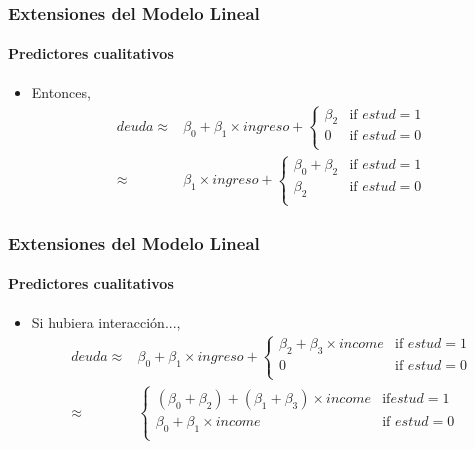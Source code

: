 \documentclass{beamer}
\begin{document}
\begin{frame}
\frametitle{Extensiones del Modelo Lineal}
\framesubtitle{Predictores cualitativos}
	\begin{itemize}
		\item Entonces, 
			\begin{equation}
			\begin{aligned}
			deuda  \approx & \beta_{0} + \beta_{1} \times ingreso + \begin{cases} 
																\beta_{2} & \text{if } estud = 1 \\
																0        & \text{if } estud = 0 \\
															   \end{cases} \\
			       \approx & \beta_{1} \times ingreso + \begin{cases} 
			       									\beta_{0} + \beta_{2} & \text{if } estud = 1 \\
			       									 \beta_{2}            & \text{if } estud = 0 \\
											       \end{cases}  				
			\end{aligned}			
			\end{equation}
	\end{itemize}
\end{frame}

\begin{frame}
\frametitle{Extensiones del Modelo Lineal}
\framesubtitle{Predictores cualitativos}

\begin{itemize}
	\item Si hubiera interacción..., 
	\begin{equation}
	\begin{aligned}
	deuda  \approx & \beta_{0} + \beta_{1} \times ingreso + \begin{cases} 
	\beta_{2} + \beta_{3} \times income  & \text{if } estud = 1 \\
	0        & \text{if } estud = 0 \\
	\end{cases} \\
	\approx & \begin{cases} 
	(\beta_{0} + \beta_{2}) + (\beta_{1} + \beta_{3}) \times income & \text{if} estud = 1 \\
	\beta_{0} + \beta_{1} \times income            & \text{if } estud = 0 \\
	\end{cases}  				
	\end{aligned}			
	\end{equation}
\end{itemize}
\end{frame}
\end{document}
